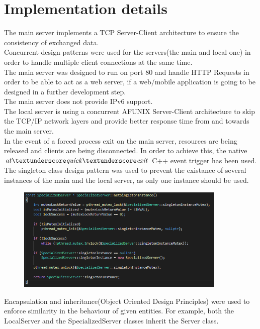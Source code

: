 \documentclass[runningheads]{llncs}
\begin{document}
\section{Implementation details}
The main server implements a TCP Server-Client architecture to ensure the consistency of exchanged data.\\
Concurrent design patterns were used for the servers(the main and local one) in order to handle multiple client connections at the same time.\\
The main server was designed to run on port 80 and handle HTTP Requests in order to be able to act as a web server, if a web/mobile application is going to be designed in a further development step.\\
The main server does not provide IPv6 support.\\
The local server is using a concurrent AF\textunderscore UNIX Server-Client architecture to skip the TCP/IP network layers and provide better response time from and towards the main server.\\
In the event of a forced process exit on the main server, resources are being released and clients are being disconnected. In order to achieve this, the native $\it {at\textunderscore quick\textunderscore exit}$ C++ event trigger has been used.\\
The singleton class design pattern was used to prevent the existance of several instances of the main and the local server, as only one instance should be used.
\begin{figure}[H]
\centering
\includegraphics[width=100mm]{Singleton_Class_Design_Pattern.png}
\end{figure}
Encapsulation and inheritance(Object Oriented Design Principles) were used to enforce similarity in the behaviour of given entities. For example, both the LocalServer and the SpecializedServer classes inherit the Server class.\\
\end{document}
